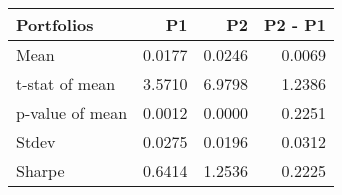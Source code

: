 \begin{tabular}{lrrr}
\toprule
Portfolios & P1 & P2 & P2 - P1 \\
\midrule
Mean & 0.0177 & 0.0246 & 0.0069 \\
t-stat of mean & 3.5710 & 6.9798 & 1.2386 \\
p-value of mean & 0.0012 & 0.0000 & 0.2251 \\
Stdev & 0.0275 & 0.0196 & 0.0312 \\
Sharpe & 0.6414 & 1.2536 & 0.2225 \\
\bottomrule
\end{tabular}
